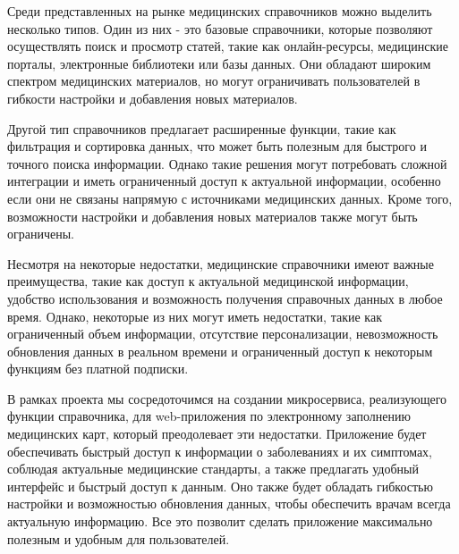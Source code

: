 Среди представленных на рынке медицинских справочников можно выделить несколько типов. Один из них - это базовые справочники, которые позволяют осуществлять поиск и просмотр статей, такие как онлайн-ресурсы, медицинские порталы, электронные библиотеки или базы данных. Они обладают широким спектром медицинских материалов, но могут ограничивать пользователей в гибкости настройки и добавления новых материалов.

Другой тип справочников предлагает расширенные функции, такие как фильтрация и сортировка данных, что может быть полезным для быстрого и точного поиска информации. Однако такие решения могут потребовать сложной интеграции и иметь ограниченный доступ к актуальной информации, особенно если они не связаны напрямую с источниками медицинских данных. Кроме того, возможности настройки и добавления новых материалов также могут быть ограничены.

Несмотря на некоторые недостатки, медицинские справочники имеют важные преимущества, такие как доступ к актуальной медицинской информации, удобство использования и возможность получения справочных данных в любое время. Однако, некоторые из них могут иметь недостатки, такие как ограниченный объем информации, отсутствие персонализации, невозможность обновления данных в реальном времени и ограниченный доступ к некоторым функциям без платной подписки.

В рамках проекта мы сосредоточимся на создании микросервиса, реализующего функции справочника, для web-приложения по электронному заполнению медицинских карт, который преодолевает эти недостатки. Приложение будет обеспечивать быстрый доступ к информации о заболеваниях и их симптомах, соблюдая актуальные медицинские стандарты, а также предлагать удобный интерфейс и быстрый доступ к данным. Оно также будет обладать гибкостью настройки и возможностью обновления данных, чтобы обеспечить врачам всегда актуальную информацию. Все это позволит сделать приложение максимально полезным и удобным для пользователей.

